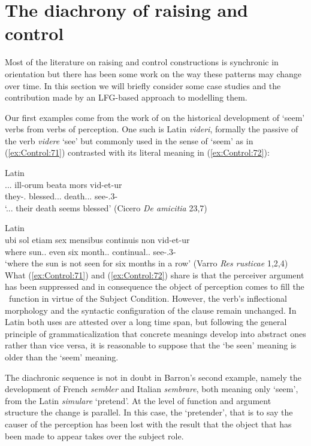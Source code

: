 \documentclass[output=paper,hidelinks]{langscibook}
\begin{document}
\section{The diachrony of raising and control}
\label{sec:Control:13}

Most of the literature on raising and control constructions is synchronic in orientation but there has been some work on the way these patterns may change over time. In this section we will briefly consider some case studies and the contribution made by an LFG-based approach to modelling them.

Our first examples come from the work of \citet{Barron1997,barron2001} on the historical development of `seem' verbs from verbs of perception. One such is Latin \emph{videri}, formally the passive of the verb \emph{videre} `see' but commonly used in the sense of `seem' as in (\ref{ex:Control:71}) contrasted with its literal meaning in (\ref{ex:Control:72}):

\ea\label{ex:Control:71}Latin\\
\gll ... ill-orum   beata      mors     vid-et-ur\\
     {} {they-\GEN.\PL} {blessed.\NOM.\F.\SG}  {death.\NOM.\F.\SG} see-\PRS.3\SG-\PASS\\
\glt    `... their death seems blessed'     (Cicero \textit{De amicitia} 23,7)
\z
                    
\ea\label{ex:Control:72}Latin\\
\gll ubi sol     etiam  sex mensibus  continuis     non vid-et-ur\\
 where {sun.\NOM.\SG} even  six  {month.\ABL.\PL} {continual.\ABL.\PL}   {\NEG} see-\PRS.3\SG-\PASS\\
\glt`where the sun is not seen for six months in a row'
 (Varro \emph{Res rusticae} 1,2,4)
 \z
What (\ref{ex:Control:71}) and (\ref{ex:Control:72}) share is that the perceiver argument has been suppressed and in consequence the object of perception comes to fill the \SUBJ\ function in virtue of the Subject Condition. However, the verb's inflectional morphology and the syntactic configuration of the clause remain unchanged. In Latin both uses are attested over a long time span, but following the general principle of grammaticalization that concrete meanings develop into abstract ones rather than vice versa, it is reasonable to suppose that the `be seen' meaning is older than the `seem' meaning.

The diachronic sequence is not in doubt in Barron's second example, namely the development of French \emph{sembler} and Italian \emph{sembrare}, both meaning only `seem', from the Latin \emph{simulare} `pretend'. At the level of function and argument structure the change is parallel. In this case, the `pretender', that is to say the causer of the perception has been lost with the result that the object that has been made to appear takes over the subject role.
\end{document}
